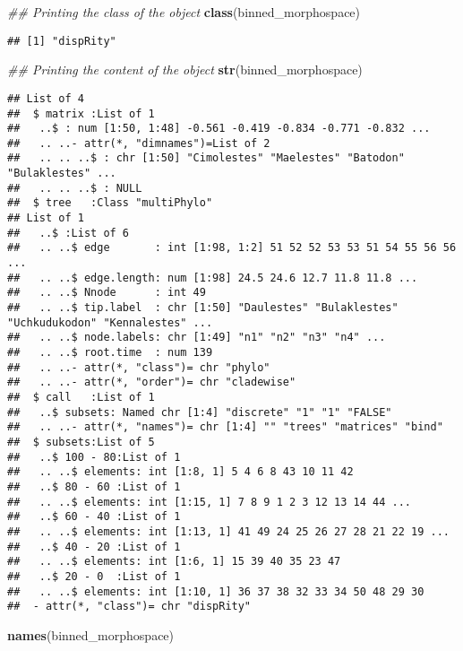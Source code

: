 \documentclass[
]{book}
\newenvironment{Shaded}{\begin{snugshade}}{\end{snugshade}}
\newcommand{\CommentTok}[1]{\textcolor[rgb]{0.56,0.35,0.01}{\textit{#1}}}
\newcommand{\KeywordTok}[1]{\textcolor[rgb]{0.13,0.29,0.53}{\textbf{#1}}}
\newcommand{\NormalTok}[1]{#1}
\begin{document}
\begin{Shaded}
\begin{Highlighting}[]
\CommentTok{\#\# Printing the class of the object}
\KeywordTok{class}\NormalTok{(binned\_morphospace)}
\end{Highlighting}
\end{Shaded}

\begin{verbatim}
## [1] "dispRity"
\end{verbatim}

\begin{Shaded}
\begin{Highlighting}[]
\CommentTok{\#\# Printing the content of the object}
\KeywordTok{str}\NormalTok{(binned\_morphospace)}
\end{Highlighting}
\end{Shaded}

\begin{verbatim}
## List of 4
##  $ matrix :List of 1
##   ..$ : num [1:50, 1:48] -0.561 -0.419 -0.834 -0.771 -0.832 ...
##   .. ..- attr(*, "dimnames")=List of 2
##   .. .. ..$ : chr [1:50] "Cimolestes" "Maelestes" "Batodon" "Bulaklestes" ...
##   .. .. ..$ : NULL
##  $ tree   :Class "multiPhylo"
## List of 1
##   ..$ :List of 6
##   .. ..$ edge       : int [1:98, 1:2] 51 52 52 53 53 51 54 55 56 56 ...
##   .. ..$ edge.length: num [1:98] 24.5 24.6 12.7 11.8 11.8 ...
##   .. ..$ Nnode      : int 49
##   .. ..$ tip.label  : chr [1:50] "Daulestes" "Bulaklestes" "Uchkudukodon" "Kennalestes" ...
##   .. ..$ node.labels: chr [1:49] "n1" "n2" "n3" "n4" ...
##   .. ..$ root.time  : num 139
##   .. ..- attr(*, "class")= chr "phylo"
##   .. ..- attr(*, "order")= chr "cladewise"
##  $ call   :List of 1
##   ..$ subsets: Named chr [1:4] "discrete" "1" "1" "FALSE"
##   .. ..- attr(*, "names")= chr [1:4] "" "trees" "matrices" "bind"
##  $ subsets:List of 5
##   ..$ 100 - 80:List of 1
##   .. ..$ elements: int [1:8, 1] 5 4 6 8 43 10 11 42
##   ..$ 80 - 60 :List of 1
##   .. ..$ elements: int [1:15, 1] 7 8 9 1 2 3 12 13 14 44 ...
##   ..$ 60 - 40 :List of 1
##   .. ..$ elements: int [1:13, 1] 41 49 24 25 26 27 28 21 22 19 ...
##   ..$ 40 - 20 :List of 1
##   .. ..$ elements: int [1:6, 1] 15 39 40 35 23 47
##   ..$ 20 - 0  :List of 1
##   .. ..$ elements: int [1:10, 1] 36 37 38 32 33 34 50 48 29 30
##  - attr(*, "class")= chr "dispRity"
\end{verbatim}

\begin{Shaded}
\begin{Highlighting}[]
\KeywordTok{names}\NormalTok{(binned\_morphospace)}
\end{Highlighting}
\end{Shaded}
\end{document}
